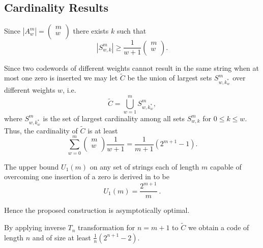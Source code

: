 \subsection{Cardinality Results}
\vspace{0.2in} Since $|A_w^m| = \left( \begin{array}{c}
                             m \\
                             w \\
                           \end{array}
                           \right)$ there exists $k$ such that
                           \[|S_{w,k}^m | \geq \frac{1}{w+1}
\left( \begin{array}{c}
                             m \\
                             w \\
                           \end{array}
                           \right).\]

Since two codewords of different weights cannot result in the same
string when at most one zero is inserted we may let $\tilde{C}$ be
the union of largest sets $S_{w,k^*_w}^m$ over different weights
$w$, i.e. \[\tilde{C}=\bigcup_{w=1}^{m} S_{w,k^*_w}^m,\] where
$S_{w,k^*_w}^m$ is the set of largest cardinality among all sets
$S_{w,k}^m$ for $0\leq k\leq w$. Thus, the cardinality of
$\tilde{C}$ is at least
\[\sum_{w=0}^m \left(
\begin{array}{c}
                             m \\
                             w \\
                           \end{array}
                           \right) \frac{1}{w+1}=\frac{1}{m+1}
                           \left(2^{m+1}-1\right).\]

The upper bound $U_1(m)$ on any set of strings each of length $m$
capable of overcoming one insertion of a zero is derived in
\cite{lev:66a} to be
\begin{equation}\label{ub0}U_1(m)=\frac{2^{m+1}}{m}~.\end{equation}

Hence the proposed construction is asymptotically optimal.

By applying inverse $T_n$ transformation for $n=m+1$ to
$\tilde{C}$ we obtain a code of length $n$ and of size at least
$\frac{1}{n}
                           \left(2^{n+1}-2\right)$.



